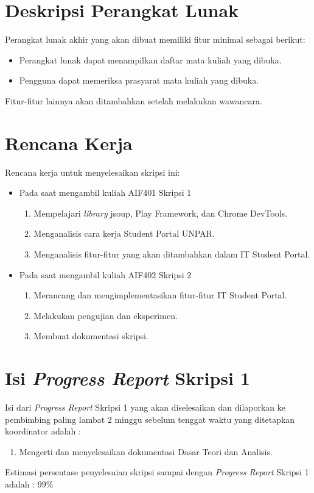 \documentclass[a4paper,twoside]{article}
\begin{document}
\section{Deskripsi Perangkat Lunak}
Perangkat lunak akhir yang akan dibuat memiliki fitur minimal sebagai berikut:
\begin{itemize}
	\item Perangkat lunak dapat menampilkan daftar mata kuliah yang dibuka.
	\item Pengguna dapat memeriksa prasyarat mata kuliah yang dibuka.
\end{itemize}
Fitur-fitur lainnya akan ditambahkan setelah melakukan wawancara.

\section{Rencana Kerja}
Rencana kerja untuk menyelesaikan skripsi ini:
\begin{itemize}
	\item Pada saat mengambil kuliah AIF401 Skripsi 1
	\begin{enumerate}
		\item Mempelajari \textit{library} jsoup, Play Framework, dan Chrome DevTools.
		\item Menganalisis cara kerja Student Portal UNPAR.
		\item Menganalisis fitur-fitur yang akan ditambahkan dalam IT Student Portal.
	\end{enumerate}
	\item Pada saat mengambil kuliah AIF402 Skripsi 2
	\begin{enumerate}
		\item Merancang dan mengimplementasikan fitur-fitur IT Student Portal. 
		\item Melakukan pengujian dan eksperimen.
		\item Membuat dokumentasi skripsi.
	\end{enumerate}
\end{itemize}

\section{Isi {\it Progress Report} Skripsi 1}
Isi dari {\it Progress Report} Skripsi 1 yang akan diselesaikan dan dilaporkan ke pembimbing paling lambat 2 minggu sebelum tenggat waktu yang ditetapkan koordinator adalah :
\begin{enumerate}
	\item Mengerti dan menyelesaikan dokumentasi Dasar Teori dan Analisis.
\end{enumerate}
Estimasi persentase penyelesaian skripsi sampai dengan {\it Progress Report} Skripsi 1 adalah : 99\%
\end{document}
